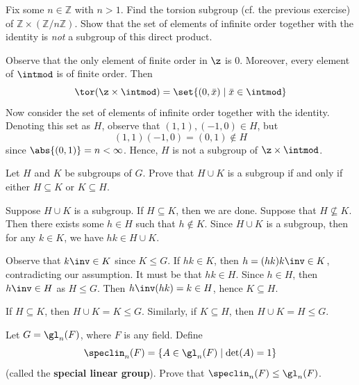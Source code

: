 \begin{exercise} \label{ex2.1.7}
    Fix some $n \in \mathbb{Z}$ with $n>1$. Find the torsion subgroup (cf. the previous exercise) of $\mathbb{Z} \times (\mathbb{Z}/n\mathbb{Z})$. Show that the set of elements of infinite order together with the identity is \emph{not} a subgroup of this direct product.
\end{exercise}

\begin{sol}
    Observe that the only element of finite order in $\z$ is 0. Moreover, every element of $\intmod$ is of finite order. Then
    \[\tor(\z \times \intmod) = \set{(0, \bar x) \mid \bar x \in \intmod}\]
    Now consider the set of elements of infinite order together with the identity. Denoting this set as $H$, observe that $(1, 1), (-1, 0) \in H$, but
    \[(1, 1)(-1, 0) = (0, 1) \not\in H\]
    since $\abs{(0, 1)} = n < \infty$. Hence, $H$ is not a subgroup of $\z \times \intmod$.
\end{sol}

\begin{exercise} \label{ex2.1.8}
    Let $H$ and $K$ be subgroups of $G$. Prove that $H \cup K$ is a subgroup if and only if either $H \subseteq K$ or $K \subseteq H$.
\end{exercise}

\begin{solitem}
    \item[\rightimp] Suppose $H \cup K$ is a subgroup. If $H \subseteq K$, then we are done. Suppose that $H \nsubseteq K$. Then there exists some $h \in H$ such that $h \not\in K$. Since $H \cup K$ is a subgroup, then for any $k \in K$, we have $hk \in H \cup K$.
    
    Observe that $k\inv \in K$ since $K \leq G$. If $hk \in K$, then $h = (hk)k\inv \in K$, contradicting our assumption. It must be that $hk \in H$. Since $h \in H$, then $h\inv \in H$ as $H \leq G$. Then $h\inv(hk) = k \in H$, hence $K \subseteq H$.
    \item[\leftimp] If $H \subseteq K$, then $H \cup K = K \leq G$. Similarly, if $K \subseteq H$, then $H \cup K = H \leq G$.
\end{solitem}

\begin{specialexercise} \label{ex2.1.9}
    Let $G = \gl_n(F)$, where $F$ is any field. Define
    \[\speclin_n(F) = \{ A \in \gl_n(F) \mid \det(A) = 1 \}\]
    (called the \textbf{special linear group}). Prove that $\speclin_n(F) \le \gl_n(F)$.
\end{specialexercise}

